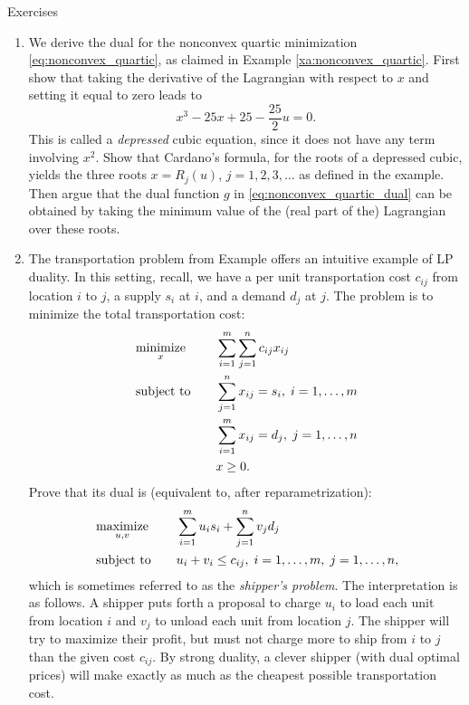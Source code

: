 \begin{xcb}{Exercises}
\begin{enumerate}[label=\thechapter.\arabic*]
\item \label{ex:nonconvex_quartic}
  We derive the dual for the nonconvex quartic minimization
  \eqref{eq:nonconvex_quartic}, as claimed in Example
  \ref{xa:nonconvex_quartic}. First show that taking the derivative of the
  Lagrangian with respect to $x$ and setting it equal to zero leads to
  \[
  x^3 - 25x + 25 - \frac{25}{2} u = 0.
  \]
  This is called a \emph{depressed} cubic equation, since it does not have any 
  term involving $x^2$. Show that Cardano's formula, for the roots of a
  depressed cubic, yields the three roots $x = R_j(u)$, $j = 1,2,3,\dots$ as
  defined in the example. Then argue that the dual function $g$ in 
  \eqref{eq:nonconvex_quartic_dual} can be obtained by taking the minimum value
  of the (real part of the) Lagrangian over these roots. 

\item The transportation problem from Example    
  offers an intuitive example of LP duality. In this setting, recall, we have a
  per unit transportation cost $c_{ij}$ from location $i$ to $j$, a supply $s_i$
  at $i$, and a demand $d_j$ at $j$. The problem is to minimize the total
  transportation cost:  
  \begin{alignat*}{2}
  &\operatorname*{minimize}_x \quad && \sum_{i=1}^m \sum_{j=1}^n c_{ij} x_{ij} \\ 
  &\operatorname{subject\,\,to} \quad && \sum_{j=1}^n x_{ij} = s_i, \; i=1,\dots,m \\
  & && \sum_{i=1}^m x_{ij} = d_j, \; j=1,\dots,n \\
  & && x \geq 0.
  \end{alignat*}
  Prove that its dual is (equivalent to, after reparametrization):    
  \begin{alignat*}{2}
  &\operatorname*{maximize}_{u,v} \quad && \sum_{i=1}^m u_i s_i + \sum_{j=1}^n v_j d_j \\  
  &\operatorname{subject\,\,to} \quad && u_i + v_i \leq c_{ij}, \; i=1,\dots,m, \; j=1,\dots,n,
  \end{alignat*}
  which is sometimes referred to as the \emph{shipper's problem}. The
  interpretation is as follows. A shipper puts forth a proposal to charge $u_i$
  to load each unit from location $i$ and $v_j$ to unload each unit from
  location $j$. The shipper will try to maximize their profit, but must not
  charge more to ship from $i$ to $j$ than the given cost $c_{ij}$. By strong
  duality, a clever shipper (with dual optimal prices) will make exactly as much
  as the cheapest possible transportation cost.    
 

\end{enumerate}
\end{xcb}
